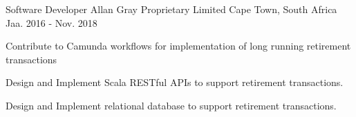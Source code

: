 \begin{cventries}
  \cventry
    {Software Developer} %
    {Allan Gray Proprietary Limited} %
    {Cape Town, South Africa} %
    {Jaa. 2016 - Nov. 2018} %
    {
      \begin{cvitems} %
        \item {Contribute to Camunda workflows for implementation of long running retirement transactions}
        \item {Design and Implement Scala RESTful APIs to support retirement transactions.} 
        \item {Design and Implement relational database to support retirement transactions.} 
      \end{cvitems}
    }


\end{cventries}
